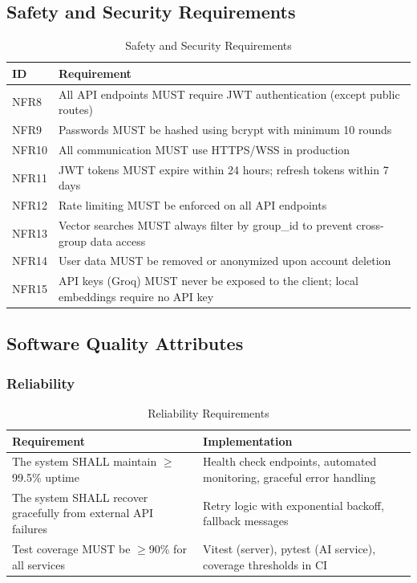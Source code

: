\documentclass[11pt,a4paper]{article}
\begin{document}
\subsection{Safety and Security Requirements}

\begin{table}[H]
\centering
\begin{tabular}{p{1.5cm}p{11.5cm}}
\toprule
\textbf{ID} & \textbf{Requirement} \\
\midrule
NFR8 & All API endpoints MUST require JWT authentication (except public routes) \\
NFR9 & Passwords MUST be hashed using bcrypt with minimum 10 rounds \\
NFR10 & All communication MUST use HTTPS/WSS in production \\
NFR11 & JWT tokens MUST expire within 24 hours; refresh tokens within 7 days \\
NFR12 & Rate limiting MUST be enforced on all API endpoints \\
NFR13 & Vector searches MUST always filter by group\_id to prevent cross-group data access \\
NFR14 & User data MUST be removed or anonymized upon account deletion \\
NFR15 & API keys (Groq) MUST never be exposed to the client; local embeddings require no API key \\
\bottomrule
\end{tabular}
\caption{Safety and Security Requirements}
\end{table}

\subsection{Software Quality Attributes}

\subsubsection{Reliability}

\begin{table}[H]
\centering
\begin{tabular}{p{5cm}p{8cm}}
\toprule
\textbf{Requirement} & \textbf{Implementation} \\
\midrule
The system SHALL maintain $\geq$99.5\% uptime & Health check endpoints, automated monitoring, graceful error handling \\
The system SHALL recover gracefully from external API failures & Retry logic with exponential backoff, fallback messages \\
Test coverage MUST be $\geq$90\% for all services & Vitest (server), pytest (AI service), coverage thresholds in CI \\
\bottomrule
\end{tabular}
\caption{Reliability Requirements}
\end{table}
\end{document}
